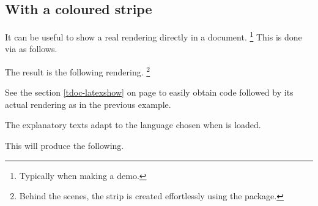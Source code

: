 \subsection{With a coloured stripe}

\begin{tdocexa} 
    It can be useful to show a real rendering directly in a document.
    \footnote{
        Typically when making a demo.
    }
    This is done via  as follows.



    The result is the following rendering.
    \footnote{
        Behind the scenes, the strip is created effortlessly using the  package.
    }
\end{tdocexa}





\smallskip

\begin{tdocrem}
    See the section \ref{tdoc-latexshow} on page \pageref{tdoc-latexshow} to easily obtain code followed by its actual rendering as in the previous example.
\end{tdocrem}


\begin{tdocnote}
    The explanatory texts adapt to the language chosen when \thispack{} is loaded.
\end{tdocnote}




\begin{tdocexa}
    \leavevmode



    This will produce the following.

    \medskip

    

\end{tdocexa}


